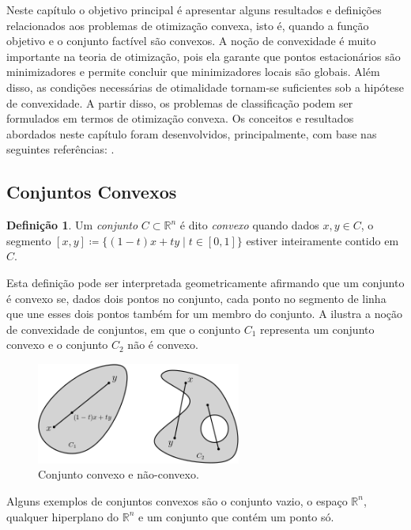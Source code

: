 \documentclass[12pt,a4paper]{scrartcl}
\def\RR{\mathds{R}}
\theoremstyle{definition}%
\newtheorem{defi}{Definição}
\begin{document}
Neste capítulo o objetivo principal é apresentar alguns resultados e definições relacionados aos problemas de otimização convexa, isto é, quando a função objetivo e o conjunto factível são convexos. A noção de convexidade é muito importante na teoria de otimização, pois ela garante que pontos estacionários são minimizadores e permite concluir que minimizadores locais são globais. Além disso, as condições necessárias de otimalidade tornam-se suficientes sob a hipótese de convexidade. A partir disso, os problemas de classificação podem ser formulados em termos de otimização convexa. Os conceitos e resultados abordados neste capítulo foram desenvolvidos, principalmente, com base nas seguintes referências: \textcite{Evelin2017,Ademir2013,Izmailov2014ac}.

\subsection{Conjuntos Convexos}

\begin{defi} 
Um \emph{conjunto} $C \subset \RR^{n}$ é dito \emph{convexo} quando dados $x,y \in C$, o segmento $[x,y] \coloneqq \{ (1-t)x + ty \mid t\in [0,1] \}$ estiver inteiramente contido em $C$.
\end{defi}

Esta definição pode ser interpretada geometricamente afirmando que um conjunto é convexo se, dados dois pontos no conjunto, cada ponto no segmento de linha que une esses dois pontos também for um membro do conjunto. A  ilustra a noção de convexidade de conjuntos, em que o conjunto $C_{1}$ representa um conjunto convexo e o conjunto $C_{2}$ não é convexo.


\begin{figure}[!ht] 
	\centering
	\includegraphics[width=0.60\textwidth]{conjuntos_convexo_naoconvexo}
	\caption{ Conjunto convexo e não-convexo. \label{fig:conjuntos_convexos}}
\end{figure}


Alguns exemplos de conjuntos convexos são o conjunto vazio, o espaço $\RR^{n}$, qualquer hiperplano do $\RR^{n}$ e um conjunto que contém um ponto só. 
\end{document}

